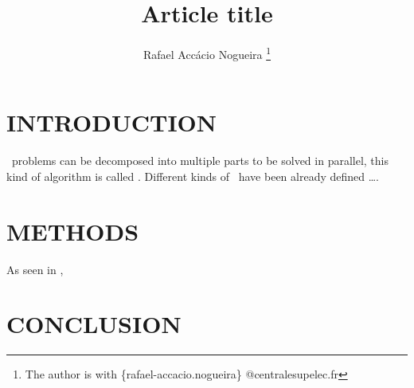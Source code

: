 \documentclass[a4paper, 10 pt, conference]{ieeeconf}  %
\title{\LARGE \bf
  Article title
}
\author{Rafael Accácio Nogueira
  \thanks{The author is with\newline
    \{rafael-accacio.nogueira\}
    @centralesupelec.fr}\newline
}
\begin{document}
\maketitle

\begin{abstract}
\blindmathfalse
\blindtext
\end{abstract}


\section{INTRODUCTION}
\mpc\ problems can be decomposed into multiple parts to be solved in parallel, this kind of algorithm is called \dmpc.
Different kinds of \dmpc\ have been already defined \dots{}.%

\section{METHODS}
As seen in \cite{NogueiraEtAl2021},
\blindmathpaper%
\blindmathpaper%


\section{CONCLUSION}
\blindtext



\end{document}
